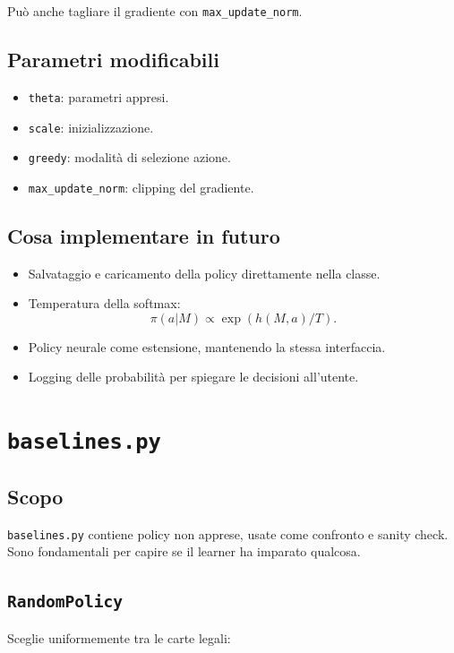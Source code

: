 \documentclass[11pt,a4paper]{article}
\begin{document}
Può anche tagliare il gradiente con \texttt{max\_update\_norm}.

\subsection{Parametri modificabili}

\begin{itemize}
  \item \texttt{theta}: parametri appresi.
  \item \texttt{scale}: inizializzazione.
  \item \texttt{greedy}: modalità di selezione azione.
  \item \texttt{max\_update\_norm}: clipping del gradiente.
\end{itemize}

\subsection{Cosa implementare in futuro}

\begin{itemize}
  \item Salvataggio e caricamento della policy direttamente nella classe.
  \item Temperatura della softmax:
  \[
  \pi(a|M) \propto \exp(h(M,a)/T).
  \]
  \item Policy neurale come estensione, mantenendo la stessa interfaccia.
  \item Logging delle probabilità per spiegare le decisioni all'utente.
\end{itemize}

\section{\texttt{baselines.py}}

\subsection{Scopo}

\texttt{baselines.py} contiene policy non apprese, usate come confronto e
sanity check. Sono fondamentali per capire se il learner ha imparato qualcosa.

\subsection{\texttt{RandomPolicy}}

Sceglie uniformemente tra le carte legali:
\end{document}
